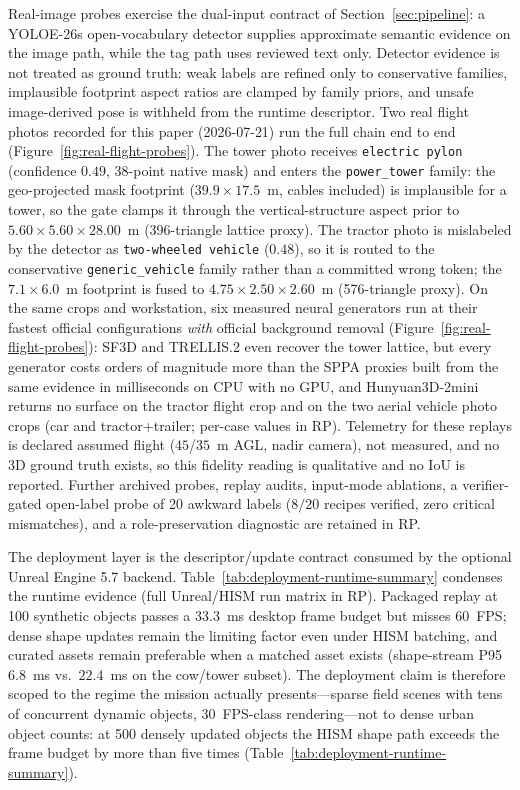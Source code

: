 \documentclass[11pt,a4paper]{article}
\begin{document}
Real-image probes exercise the dual-input contract of
Section~\ref{sec:pipeline}: a YOLOE-26s
open-vocabulary detector supplies approximate semantic evidence on the image
path, while the tag path uses reviewed text only. Detector evidence is not
treated as ground truth: weak labels are refined only to conservative
families, implausible footprint aspect ratios are clamped by family priors, and
unsafe image-derived pose is withheld from the runtime descriptor.
Two real flight photos recorded for this paper (2026-07-21) run the full
chain end to end (Figure~\ref{fig:real-flight-probes}). The tower photo
receives \texttt{electric pylon} (confidence \(0.49\), 38-point native mask)
and enters the \texttt{power\_tower} family: the geo-projected mask footprint
(\(39.9\times17.5\)~m, cables included) is implausible for a tower, so the
gate clamps it through the vertical-structure aspect prior to
\(5.60\times5.60\times28.00\)~m (396-triangle lattice
proxy). The tractor photo is mislabeled by the detector as
\texttt{two-wheeled vehicle} (\(0.48\)), so it is routed to the conservative
\texttt{generic\_vehicle} family rather than a committed wrong token; the
\(7.1\times6.0\)~m footprint is fused to \(4.75\times2.50\times2.60\)~m
(576-triangle proxy). On the same crops and workstation, six measured neural
generators run at
their fastest official configurations \emph{with} official background removal
(Figure~\ref{fig:real-flight-probes}):
SF3D and TRELLIS.2 even recover the tower lattice, but every generator
costs orders of magnitude more than the SPPA proxies built from the same
evidence in milliseconds on CPU with no GPU, and Hunyuan3D-2mini
returns no surface on the tractor flight crop and on the two aerial vehicle
photo crops (car and tractor+trailer; per-case values
in RP). Telemetry
for these replays is declared assumed flight
(\(45\)/\(35\)~m AGL, nadir camera), not measured, and no 3D ground truth
exists, so this fidelity reading is qualitative and no IoU is
reported. Further archived probes, replay audits, input-mode
ablations, a verifier-gated open-label probe of 20 awkward labels (\(8/20\)
recipes verified, zero critical mismatches), and a role-preservation
diagnostic are retained in RP.

The deployment layer is the descriptor/update contract consumed by the
optional Unreal Engine 5.7 backend. Table~\ref{tab:deployment-runtime-summary}
condenses the runtime evidence (full Unreal/HISM run matrix in RP). Packaged
replay at 100 synthetic objects passes a
33.3~ms desktop frame budget but misses 60~FPS; dense shape updates remain the
limiting factor even under HISM batching, and curated assets remain preferable
when a matched asset exists (shape-stream P95 \(6.8\)~ms vs.\ \(22.4\)~ms
on the cow/tower subset). The deployment claim is therefore scoped to the
regime the mission actually presents---sparse field scenes with tens of
concurrent dynamic objects, 30~FPS-class rendering---not to dense urban
object counts: at 500 densely updated objects the HISM shape path exceeds the
frame budget by more than five times (Table~\ref{tab:deployment-runtime-summary}).
\end{document}
